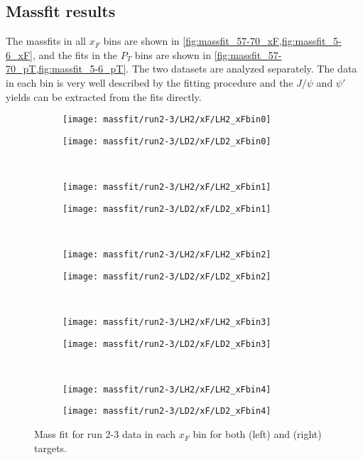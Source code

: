 \documentclass[../main.tex]{subfiles}
\begin{document}
\subsection{Massfit results}
The massfits in all $x_F$ bins are shown in \cref{fig:massfit_57-70_xF,fig:massfit_5-6_xF},
and the fits in the $P_T$ bins are shown in \cref{fig:massfit_57-70_pT,fig:massfit_5-6_pT}.
The two datasets are analyzed separately. The data in each bin is very well described by the fitting procedure
and the $J/\psi$ and $\psi'$ yields can be extracted from the fits directly.
\begin{figure}[h]
	\centering
	\begin{subfigure}{0.4\linewidth}
		\texttt{[image: massfit/run2-3/LH2/xF/LH2\_xFbin0]}
	\end{subfigure}
	\begin{subfigure}{0.4\linewidth}
		\texttt{[image: massfit/run2-3/LD2/xF/LD2\_xFbin0]}
	\end{subfigure}\\
	\begin{subfigure}{0.4\linewidth}
		\texttt{[image: massfit/run2-3/LH2/xF/LH2\_xFbin1]}
	\end{subfigure}
	\begin{subfigure}{0.4\linewidth}
		\texttt{[image: massfit/run2-3/LD2/xF/LD2\_xFbin1]}
	\end{subfigure}\\
	\begin{subfigure}{0.4\linewidth}
		\texttt{[image: massfit/run2-3/LH2/xF/LH2\_xFbin2]}
	\end{subfigure}
	\begin{subfigure}{0.4\linewidth}
		\texttt{[image: massfit/run2-3/LD2/xF/LD2\_xFbin2]}
	\end{subfigure}\\
	\begin{subfigure}{0.4\linewidth}
		\texttt{[image: massfit/run2-3/LH2/xF/LH2\_xFbin3]}
	\end{subfigure}
	\begin{subfigure}{0.4\linewidth}
		\texttt{[image: massfit/run2-3/LD2/xF/LD2\_xFbin3]}
	\end{subfigure}\\
	\begin{subfigure}{0.4\linewidth}
		\texttt{[image: massfit/run2-3/LH2/xF/LH2\_xFbin4]}
	\end{subfigure}
	\begin{subfigure}{0.4\linewidth}
		\texttt{[image: massfit/run2-3/LD2/xF/LD2\_xFbin4]}
	\end{subfigure}
	\caption{Mass fit for run 2-3 data in each $x_F$ bin for both (left) and (right) targets. }
	\label{fig:massfit_57-70_xF}
\end{figure}
\end{document}
